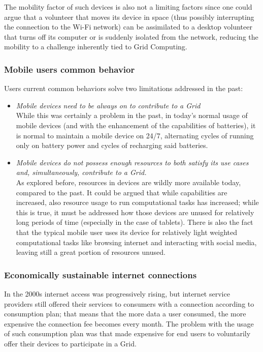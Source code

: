 The mobility factor of such devices is also not a limiting factors since one could argue that a volunteer that moves its device in space (thus possibly interrupting the connection to the Wi-Fi network) can be assimilated to a desktop volunteer that turns off its computer or is suddenly isolated from the network, reducing the mobility to a challenge inherently tied to Grid Computing.

\subsubsection{Mobile users common behavior}
Users current common behaviors solve two limitations addressed in the past:
\begin{itemize}
    \item \textit{Mobile devices need to be always on to contribute to a Grid}\\
    While this was certainly a problem in the past, in today's normal usage of mobile devices (and with the enhancement of the capabilities of batteries), it is normal to maintain a mobile device on 24/7, alternating cycles of running only on battery power and cycles of recharging said batteries.
    \item \textit{Mobile devices do not possess enough resources to both satisfy its use cases and, simultaneously, contribute to a Grid.}\\
    As explored before, resources in devices are wildly more available today, compared to the past. It could be argued that while capabilities are increased, also resource usage to run computational tasks has increased; while this is true, it must be addressed how those devices are unused for relatively long periods of time (especially in the case of tablets). There is also the fact that the typical mobile user uses its device for relatively light weighted computational tasks like browsing internet and interacting with social media, leaving still a great portion of resources unused.
\end{itemize}

\subsubsection{Economically sustainable internet connections}
In the 2000s internet access was progressively rising, but internet service providers still offered their services to consumers with a connection according to consumption plan; that means that the more data a user consumed, the more expensive the connection fee becomes every month. The problem with the usage of such consumption plan was that made expensive for end users to voluntarily offer their devices to participate in a Grid.

